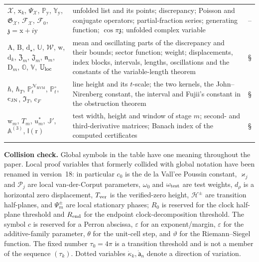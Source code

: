\documentclass[11pt,reqno]{amsart}
\makeatletter
\let\CG@origref\ref
\let\CG@origeqref\eqref
\newcommand{\CG@gettip}[1]{\@ifundefined{CGTip@#1}{Reference: #1}{\csname CGTip@#1\endcsname}}
\DeclareRobustCommand{\CGref}[1]{\pdftooltip{\CG@origref{#1}}{\CG@gettip{#1}}}
\DeclareRobustCommand{\CGeqref}[1]{\pdftooltip{\CG@origeqref{#1}}{\CG@gettip{#1}}}
\numberwithin{equation}{section}
\theoremstyle{plain}
\theoremstyle{definition}
\theoremstyle{remark}
\newcommand{\eps}{\varepsilon}
\newcommand{\RVM}{\mathrm{RVM}}
\newcommand{\NR}{\mathcal N_{\RVM}}
\makeatother
\begin{document}
{\begin{longtable}{>{\raggedright\arraybackslash}p{}>{\raggedright\arraybackslash}p{}>{\raggedright\arraybackslash}p{}}
$\mathscr X$, $\mathrm x_k$, $\varPsi_{\mathscr X}$, $\mathbb P_{\mathrm y}$, $\mathbb Y_{\mathrm y}$, $\mathfrak G_{\mathscr X}$, $\mathcal F_{\mathscr X}$, $\mathcal F_0$, $\mathfrak z=\mathrm x+i\mathrm y$ & unfolded list and its points; discrepancy; Poisson and conjugate operators; partial-fraction series; generating function; $\cos\pi\mathfrak z$; unfolded complex variable & \CGeqref{eq:rb-H}--\CGeqref{eq:rb-F-formula}\\
$\mathrm A$, $\mathrm B$, $\mathrm d_\star$, $\mathbb U$, $\mathcal W$, $\mathrm w$, $\mathrm d_k$, $\mathfrak Z_m$, $\mathfrak J_m$, $\mathfrak n_m$, $\mathrm D_m$, $\mathbb O$, $\mathbb V$, $\mathbb U_{\rm loc}$ & mean and oscillating parts of the discrepancy and their bounds; sector function; weight; displacements, index blocks, intervals, lengths, oscillations and the constants of the variable-length theorem & \S\CGref{subsec:rb-riesz}\\
$\hbar$, $\hbar_T$, $\mathbb P^{\NR}_t$, $\mathbb P^{\circ}_t$, $\mathrm c_{\rm JN}$, $\mathfrak I_T$, $\mathrm c_F$ & line height and its $t$-scale; the two kernels, the John--Nirenberg constant, the interval and Fujii's constant in the obstruction theorem & \S\CGref{subsec:rb-obstruction}\\
$\mathrm w_m$, $T_m$, $u^*_m$, $\mathbb J'$, $\mathbb A^{(3)}$, $\mathsf l(\mathrm r)$ & test width, height and window of stage $m$; second- and third-derivative matrices; Banach index of the computed certificates & \S\CGref{subsec:rb-numerics}\\
\end{longtable}
}

\medskip\noindent\textbf{Collision check.}
Global symbols in the table have one meaning throughout the paper.  Local proof variables that formerly collided with global notation have been renamed in version~18: in particular $c_0$ is the de la Vall'ee Poussin constant, $\varkappa_j$ and $\mathcal P_j$ are local van-der-Corput parameters, $\omega_0$ and $\omega_{\rm test}$ are test weights, $d_\rho$ is a horizontal zero displacement, $T_{\rm ver}$ is the verified-zero height, $\mathcal H^\pm$ are transition half-planes, and $\Psi_m^\pm$ are local stationary phases; $R_0$ is reserved for the clock half-plane threshold and $R_{\rm end}$ for the endpoint clock-decomposition threshold.  The symbol $c$ is reserved for a Perron abscissa, $\eps$ for an exponent/margin, $\varepsilon$ for the additive-family parameter, $\theta$ for the unit-cell step, and $\vartheta$ for the Riemann--Siegel function.  The fixed number $\tau_0=4\pi$ is a transition threshold and is not a member of the sequence $(\tau_k)$.  Dotted variables $\dot\kappa_k,\dot{\mathsf a}_n$ denote a direction of variation.
\end{document}

